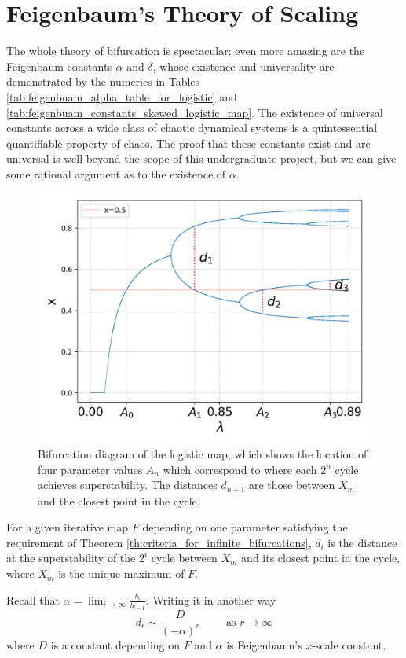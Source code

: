 \section{Feigenbaum's Theory of Scaling}

The whole theory of bifurcation is spectacular; even more amazing are the Feigenbaum constants $\alpha$ and $\delta$, whose existence and universality are demonstrated by the numerics in Tables \ref{tab:feigenbuam_alpha_table_for_logistic} and \ref{tab:feigenbuam_constants_skewed_logistic_map}. 
The existence of universal constants across a wide class of chaotic dynamical systems is a quintessential quantifiable property of chaos.
The proof that these constants exist and are universal is well beyond the scope of this undergraduate project, but we can give some rational argument as to the existence of $\alpha$.

\begin{figure}
    \centering
    \includegraphics[width=0.6\linewidth]{Images/demonstration of feigenbaum constants.png}
    \caption{Bifurcation diagram of the logistic map, which shows the location of four parameter values $A_n$ which correspond to where each $2^n$ cycle achieves superstability. The distances $d_{n+1}$ are those between $X_m$ and the closest point in the cycle.}
	\label{fig:universal_raito}
\end{figure} 

For a given iterative map $F$ depending on one parameter satisfying the requirement of Theorem \ref{th:criteria_for_infinite_bifurcations}, $d_i$ is the distance at the superstability of the $2^{i}$ cycle between $X_{m}$ and its closest point in the cycle, where $X_m$ is the unique maximum of $F$.

Recall that $\alpha = \lim_{i \rightarrow  \infty}\frac{b_i}{b_{i-1}}$. 
Writing it in another way
\begin{equation}\label{eq:d_sim}
d_r \sim\frac{D}{(-\alpha)^r} \quad \quad \text{ as } r \to \infty
\end{equation}
where $D$ is a constant depending on $F$ and $\alpha$ is Feigenbaum's $x$-scale constant. 

